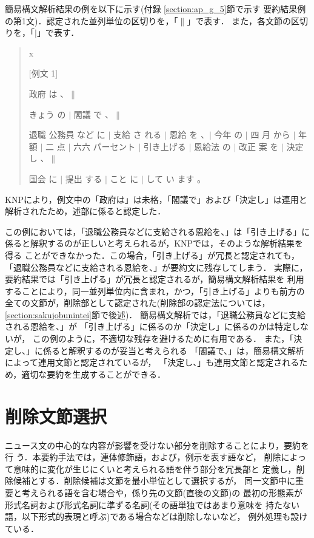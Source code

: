 簡易構文解析結果の例を以下に示す(付録 \ref{section:ap_g_5}節で示す
要約結果例の第1文)．認定された並列単位の区切りを，「$\parallel$」で表す．
また，各文節の区切りを，「$\mid$」で表す．
\begin{quote}
 \begin{namelist}{x}
  
  \item[{[例文 1]}] 　

政府 は 、$\parallel$

きょう の $\mid$ 閣議 で 、$\parallel$

退職 公務員 など に $\mid$ 支給 さ れる $\mid$ 恩給 を 、$\mid$ 今年 の $\mid$
四 月 から $\mid$ 年額 $\mid$ 二 点 $\mid$ 六六 パーセント $\mid$ 引き上げる $\mid$
恩給法 の $\mid$ 改正 案 を $\mid$ 決定 し 、$\parallel$

国会 に $\mid$ 提出 する $\mid$ こと に $\mid$ して い ます 。

 \end{namelist}
\end{quote}
KNPにより，例文中の「政府は」は未格，「閣議で」および「決定し」は連用と
解析されたため，述部に係ると認定した．

この例においては，「退職公務員などに支給される恩給を、」は「引き上げる」に
係ると解釈するのが正しいと考えられるが，KNPでは，そのような解析結果を得る
ことができなかった．この場合，「引き上げる」が冗長と認定されても，
「退職公務員などに支給される恩給を、」が要約文に残存してしまう．
実際に，要約結果では「引き上げる」が冗長と認定されるが，簡易構文解析結果を
利用することにより，同一並列単位内に含まれ，かつ，「引き上げる」よりも前方の
全ての文節が，削除部として認定された(削除部の認定法については，
\ref{section:sakujobunintei}節で後述)．
簡易構文解析では，「退職公務員などに支給される恩給を、」が
「引き上げる」に係るのか「決定し」に係るのかは特定しないが，
この例のように，不適切な残存を避けるために有用である．
また，「決定し、」に係ると解釈するのが妥当と考えられる
「閣議で、」は，簡易構文解析によって連用文節と認定されているが，
「決定し、」も連用文節と認定されるため，適切な要約を生成することができる．

\section{削除文節選択}
\label{section:sakujobunsetusentaku}

ニュース文の中心的な内容が影響を受けない部分を削除することにより，要約を行
う．本要約手法では，連体修飾語，および，例示を表す語など，
削除によって意味的に変化が生じにくいと考えられる語を伴う部分を冗長部と
定義し，削除候補とする．削除候補は文節を最小単位として選択するが，
同一文節中に重要と考えられる語を含む場合や，係り先の文節(直後の文節)の
最初の形態素が形式名詞および形式名詞に準ずる名詞(その語単独ではあまり意味を
持たない語，以下形式的表現と呼ぶ)である場合などは削除しないなど，
例外処理も設けている．

